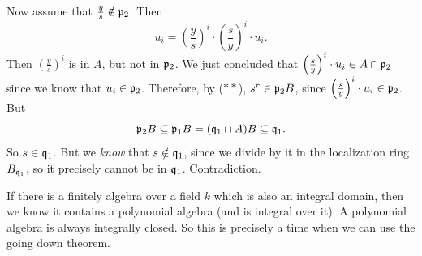 \documentclass{article}
\begin{document}
Now assume that $\frac{y}{s} \notin \mathfrak{p}_{2}$. Then \[u_{i} = \left(\frac{y}{s}\right)^{i} \cdot \left( \frac{s}{y} \right)^{i} \cdot u_{i}.\]
Then $\left(\frac{y}{s}\right)^{i}$ is in $A$, but not in $\mathfrak{p}_{2}$. We just concluded that $\left( \frac{s}{y} \right)^{i} \cdot u_{i} \in A \cap \mathfrak{p}_{2}$ since we know that $u_{i} \in \mathfrak{p}_{2}$. Therefore, by ($**$), $s^{r} \in \mathfrak{p}_{2}B$, since $\left(\frac{s}{y}\right)^{i}\cdot u_{i} \in \mathfrak{p}_{2}$. But \[\mathfrak{p}_{2}B \subseteq \mathfrak{p}_{1}B = (\mathfrak{q}_{1} \cap A)B \subseteq \mathfrak{q}_{1}.\] So $s \in \mathfrak{q}_{1}$. But we \textit{know} that $s \notin \mathfrak{q}_{1}$, since we divide by it in the localization ring $B_{\mathfrak{q}_{1}}$, so it precisely cannot be in $\mathfrak{q}_{1}$. Contradiction.
\endproof
\begin{remark*}
    If there is a finitely algebra over a field $k$ which is also an integral domain, then we know it contains a polynomial algebra (and is integral over it). A polynomial algebra is always integrally closed. So this is precisely a time when we can use the going down theorem.
\end{remark*}
\end{document}
